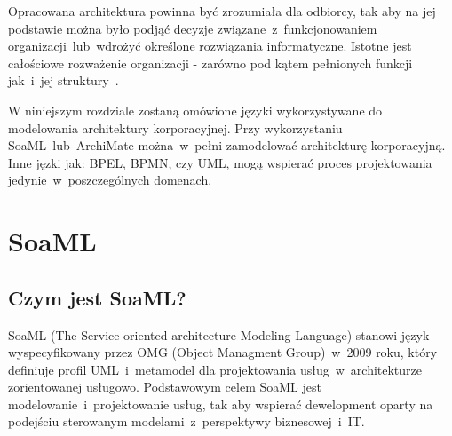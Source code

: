 Opracowana architektura powinna być zrozumiała dla odbiorcy, tak aby na jej podstawie można było podjąć decyzje związane~z~funkcjonowaniem organizacji~lub~wdrożyć określone rozwiązania informatyczne. Istotne jest całościowe rozważenie organizacji - zarówno pod kątem pełnionych funkcji jak~i~jej struktury~\cite{ArchKorpSob}.

W niniejszym rozdziale zostaną omówione języki wykorzystywane do modelowania architektury korporacyjnej. Przy wykorzystaniu SoaML~lub~ArchiMate można~w~pełni zamodelować architekturę korporacyjną. Inne jęzki jak: BPEL, BPMN, czy UML, mogą wspierać proces projektowania jedynie~w~poszczególnych domenach.

\section{SoaML}
\subsection{Czym jest SoaML?}
SoaML (The Service oriented architecture Modeling Language) stanowi język wyspecyfikowany przez OMG (Object Managment Group)~w~2009 roku, który definiuje profil UML~i~metamodel dla projektowania usług~w~architekturze zorientowanej usługowo. Podstawowym celem SoaML jest modelowanie~i~projektowanie usług, tak aby wspierać dewelopment oparty na podejściu sterowanym modelami~z~perspektywy biznesowej~i~IT.

